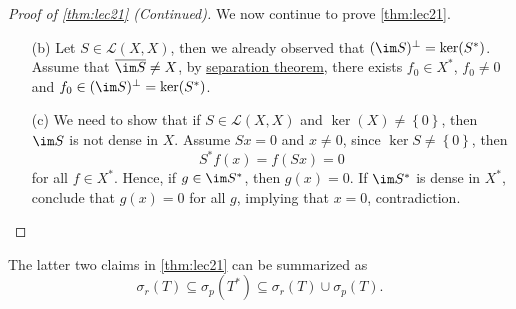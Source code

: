 \begin{proof}[Proof of \autoref{thm:lec21} (Continued)]
	We now continue to prove \autoref{thm:lec21}.
	\begin{enumerate}
		\item[(b)] Let \(S\in \mathcal{L} (X, X)\), then we already observed that \((\im S)^{\perp} = \ker(S^{\ast} )\). Assume that \(\overline{\im S} \neq X\), by \hyperref[thm:separation-of-convex-sets]{separation theorem}, there exists \(f_0\in X^{\ast} \), \(f_0 \neq 0\) and \(f_0 \in (\im S)^{\perp} = \ker(S^{\ast} )\).
		\item[(c)] We need to show that if \(S\in \mathcal{L} (X, X)\) and \(\ker(X) \neq \left\{ 0 \right\} \), then \(\im S\) is not dense in \(X\). Assume \(Sx = 0\) and \(x \neq 0\), since \(\ker S \neq \left\{ 0 \right\} \), then
			\[
				S^{\ast} f(x) = f(Sx) = 0
			\]
			for all \(f\in X^{\ast} \). Hence, if \(g\in \im S^{\ast} \), then \(g(x) = 0\). If \(\im S^{\ast} \) is dense in \(X^{\ast} \), conclude that \(g(x) = 0\) for all \(g\), implying that \(x = 0\), contradiction.
	\end{enumerate}
\end{proof}

\begin{remark}
	The latter two claims in \autoref{thm:lec21} can be summarized as
	\[
		\sigma _r(T) \subseteq \sigma _p(T^{\ast} ) \subseteq \sigma _r(T) \cup \sigma _p(T).
	\]
\end{remark}

